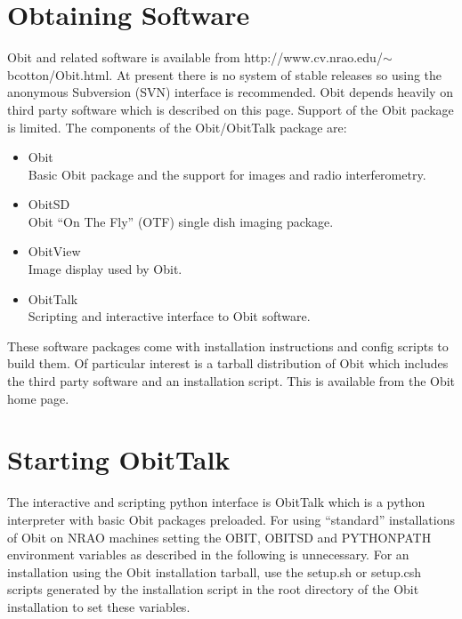 \documentclass[11pt]{report}
\begin{document}
\section {Obtaining Software}
Obit and related software is available from
http://www.cv.nrao.edu/$\sim$bcotton/Obit.html. 
At present there is no system of stable releases so using the
anonymous Subversion (SVN) interface is recommended.
Obit depends heavily on third party software which is described on
this page.
Support of the Obit package is limited.
The components of the Obit/ObitTalk package are:
\begin{itemize}
\item Obit\\
Basic Obit package and the support for images and radio interferometry.
\item ObitSD\\
Obit ``On The Fly'' (OTF) single dish imaging package.
\item ObitView\\
Image display used by Obit.
\item ObitTalk\\
Scripting and interactive interface to Obit software.
\end{itemize}
These software packages come with installation instructions and config
scripts to build them.
Of particular interest is a tarball distribution of Obit which
includes the third party software and an installation script.
This is available from the Obit home page.

\section {Starting ObitTalk}
The interactive and scripting python interface is ObitTalk which is a
python interpreter with basic Obit packages preloaded.
For using ``standard'' installations of Obit on NRAO machines setting
the OBIT, OBITSD and PYTHONPATH environment variables as described in
the following is unnecessary.
For an installation using the Obit installation tarball, use the
setup.sh or setup.csh scripts generated by the installation script in
the root directory of the Obit installation to set these variables.
\end{document}
